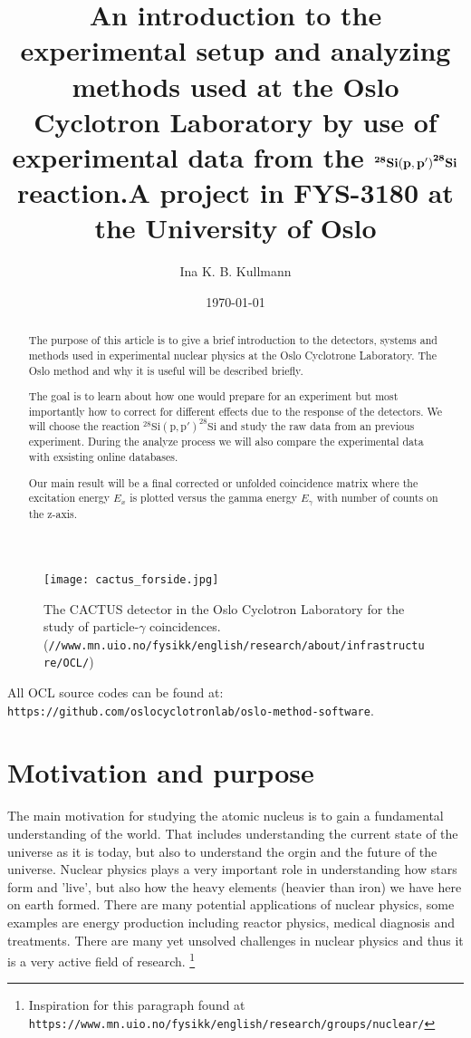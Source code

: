 \documentclass[11pt,a4wide]{article}
\title{{\huge {\bf An introduction to the experimental setup and analyzing methods used at the Oslo Cyclotron Laboratory by use of experimental data from the $\bf {}^{28}\mathrm{ \bf Si(p,p')}^{28}\mathrm{\bf Si}$ reaction.}}\linebreak \linebreak \small{A project in FYS-3180 at} \linebreak \Large{the University of Oslo} }
\author{Ina K. B. Kullmann}
\date{\today}
\begin{document}
\maketitle

\begin{abstract}
The purpose of this article is to give a brief introduction to the detectors, systems and methods used in experimental nuclear physics at the Oslo Cyclotrone Laboratory. The Oslo method and why it is useful will be described briefly.

The goal is to learn about how one would prepare for an experiment but most importantly how to correct for different effects due to the response of the detectors. We will choose the reaction ${}^{28}\mathrm{Si(p,p')}^{28}\mathrm{Si}$ and study the raw data from an previous experiment. During the analyze process we will also compare the experimental data with exsisting online databases. 

Our main result will be a final corrected or unfolded coincidence matrix where the excitation energy $E_x$ is plotted versus the gamma energy $E_\gamma$ with number of counts on the z-axis. 
\end{abstract}

\begin{figure}[htp]
\centering
\texttt{[image: cactus\_forside.jpg]}
\caption{The CACTUS detector in the Oslo Cyclotron Laboratory for the study of particle-$\gamma$ coincidences. (\texttt{//www.mn.uio.no/fysikk/english/research/about/infrastructure/OCL/}) }
\label{fig:front_page}
\end{figure}

\begin{center}
{ \scriptsize \noindent All OCL source codes can be found at: \texttt{https://github.com/oslocyclotronlab/oslo-method-software}. }
\end{center}

\newpage

\tableofcontents
\newpage

\section{Motivation and purpose}
The main motivation for studying the atomic nucleus is to gain a fundamental understanding of the world. That includes understanding the current state of the universe as it is today, but also to understand the orgin and the future of the universe. Nuclear physics plays a very important role in understanding how stars form and 'live', but also how the heavy elements (heavier than iron) we have here on earth formed. There are many potential applications of nuclear physics, some examples are energy production including reactor physics, medical diagnosis and treatments. There are many yet unsolved challenges in nuclear physics and thus it is a very active field of research. \footnote{Inspiration for this paragraph found at \texttt{https://www.mn.uio.no/fysikk/english/research/groups/nuclear/}}
\end{document}
